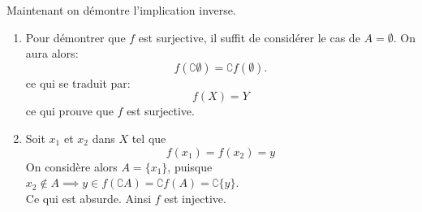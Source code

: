 \documentclass{report}
\begin{document}
\begin{myproof}
\begin{enumerate}
Maintenant on démontre l'implication inverse. 
\begin{enumerate}
  \item Pour démontrer que $f$ est surjective, il suffit de considérer le cas de
    $A=\emptyset$.
    On aura alors:
    $$
    f(\complement \emptyset) = \complement f(\emptyset).
    $$
    ce qui se traduit par:
    $$
    f(X) = Y
    $$
    ce qui prouve que $f$ est surjective.
  \item Soit $x_1$ et $x_2$ dans $X$ tel que 
    $$
    f(x_1) = f(x_2) = y
    $$
    On considère alors $A= \{x_1\}$, puisque $x_2 \not \in A \implies y \in
    f(\complement A) = \complement f(A) = \complement \{y\}$.\\ Ce qui est
    absurde. Ainsi $f$ est injective.
\end{enumerate}
 \end{enumerate} 
\end{myproof}



\end{document}
